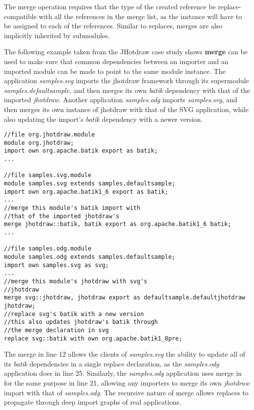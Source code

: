 The merge operation requires that the type of the created reference be 
replace-compatible with all the references in the merge list, as the instance will
have to be assigned to each of the references. Similar to replaces, merges 
are also implicitly inherited by submodules.

The following example taken from the JHotdraw case study shows \textbf{merge}
can be used to make sure that common dependencies between an importer and
an imported module can be made to point to the same module instance. The
application \textit{samples.svg} imports the jhotdraw framework through
its supermodule \textit{samples.defaultsample}, and then merges
its own \textit{batik} dependency with that of the imported \textit{jhotdraw}.
Another application \textit{samples.odg} imports \textit{samples.svg}, 
and then merges its own instance of jhotdraw with that of the SVG application, 
while also updating the import's \textit{batik} dependency with a newer version.

\begin{lstlisting}[caption=Merge]
//file org.jhotdraw.module
module org.jhotdraw;
import own org.apache.batik export as batik;
...

//file samples.svg.module
module samples.svg extends samples.defaultsample;
import own org.apache.batik1_6 export as batik;
...
//merge this module's batik import with
//that of the imported jhotdraw's
merge jhotdraw::batik, batik export as org.apache.batik1_6 batik;
...

//file samples.odg.module
module samples.odg extends samples.defaultsample;
import own samples.svg as svg;
...
//merge this module's jhotdraw with svg's
//jhotdraw
merge svg::jhotdraw, jhotdraw export as defaultsample.defaultjhotdraw jhotdraw;
//replace svg's batik with a new version
//this also updates jhotdraw's batik through
//the merge declaration in svg
replace svg::batik with own org.apache.batik1_8pre;
\end{lstlisting}


The merge in line 12 allows the clients of \textit{samples.svg}
the ability to update all of its \textit{batik} dependencies
in a single replace declaration, as the \textit{samples.odg}
application does in line 25. Similarly, the \textit{samples.odg} application
uses merge in for the same purpose in line 21, allowing any importers
to merge its own \textit{jhotdraw} import with that of \textit{samples.odg}.
The recursive nature of merge allows replaces to propagate through deep
import graphs of real applications. 

